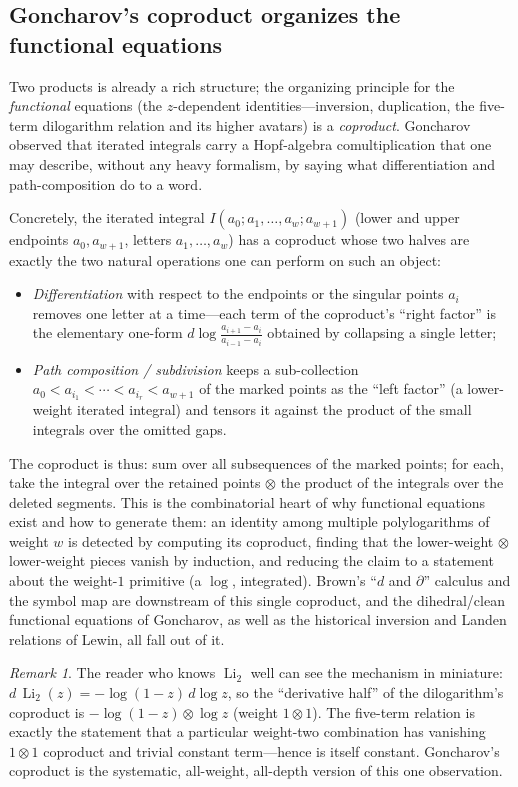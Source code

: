 \documentclass[11pt]{article}
\DeclareMathOperator{\Li}{Li}
\theoremstyle{plain}
\theoremstyle{remark}
\newtheorem{remark}[theorem]{Remark}
\begin{document}
\subsection{Goncharov's coproduct organizes the functional equations}

Two products is already a rich structure; the organizing principle for the \emph{functional} equations (the $z$-dependent identities---inversion, duplication, the five-term dilogarithm relation and its higher avatars) is a \emph{coproduct}. Goncharov observed that iterated integrals carry a Hopf-algebra comultiplication that one may describe, without any heavy formalism, by saying what differentiation and path-composition do to a word.

Concretely, the iterated integral $I(a_0;a_1,\dots,a_w;a_{w+1})$ (lower and upper endpoints $a_0,a_{w+1}$, letters $a_1,\dots,a_w$) has a coproduct whose two halves are exactly the two natural operations one can perform on such an object:
\begin{itemize}
\item \emph{Differentiation} with respect to the endpoints or the singular points $a_i$ removes one letter at a time---each term of the coproduct's ``right factor'' is the elementary one-form $d\log\frac{a_{i+1}-a_i}{a_{i-1}-a_i}$ obtained by collapsing a single letter;
\item \emph{Path composition / subdivision} keeps a sub-collection $a_0<a_{i_1}<\cdots<a_{i_r}<a_{w+1}$ of the marked points as the ``left factor'' (a lower-weight iterated integral) and tensors it against the product of the small integrals over the omitted gaps.
\end{itemize}
The coproduct is thus: sum over all subsequences of the marked points; for each, take the integral over the retained points $\otimes$ the product of the integrals over the deleted segments. This is the combinatorial heart of why functional equations exist and how to generate them: an identity among multiple polylogarithms of weight $w$ is detected by computing its coproduct, finding that the lower-weight $\otimes$ lower-weight pieces vanish by induction, and reducing the claim to a statement about the weight-$1$ primitive (a $\log$, integrated). Brown's ``$d$ and $\partial$'' calculus and the symbol map are downstream of this single coproduct, and the dihedral/clean functional equations of Goncharov, as well as the historical inversion and Landen relations of Lewin, all fall out of it.

\begin{remark}
The reader who knows $\Li_2$ well can see the mechanism in miniature: $d\,\Li_2(z)=-\log(1-z)\,d\log z$, so the ``derivative half'' of the dilogarithm's coproduct is $-\log(1-z)\otimes\log z$ (weight $1\otimes1$). The five-term relation is exactly the statement that a particular weight-two combination has vanishing $1\otimes1$ coproduct and trivial constant term---hence is itself constant. Goncharov's coproduct is the systematic, all-weight, all-depth version of this one observation.
\end{remark}
\end{document}
